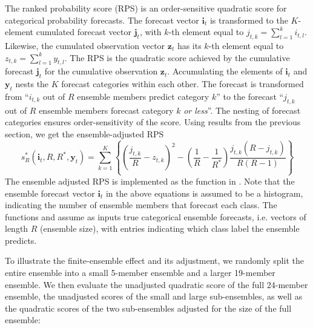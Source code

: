 \documentclass[article]{jss}\usepackage{graphicx, color}
\begin{document}
The ranked probability score (RPS) is an order-sensitive quadratic score for categorical probability forecasts.
The forecast vector $\mathbf{i}_t$ is transformed to the $K$-element cumulated forecast vector $\mathbf{j}_t$, with $k$-th element equal to $j_{t,k} = \sum_{l=1}^k i_{t,l}$.
Likewise, the cumulated observation vector $\mathbf{z}_t$ has its $k$-th element equal to $z_{t,k} = \sum_{l=1}^k y_{t,l}$.
The RPS is the quadratic score achieved by the cumulative forecast $\mathbf{j}_t$ for the cumulative observation $\mathbf{z}_t$.
Accumulating the elements of $\mathbf{i}_t$ and $\mathbf{y}_t$ nests the $K$ forecast categories within each other. 
The forecast is transformed from ``$i_{t,k}$ out of $R$ ensemble members predict category $k$'' to the forecast ``$j_{t,k}$ out of $R$ ensemble members forecast category $k$ \emph{or less}''.
The nesting of forecast categories ensures order-sensitivity of the score.
Using results from the previous section, we get the ensemble-adjusted RPS
%
\begin{equation}
s_{R}^*(\mathbf{i}_t, R, R^*, \mathbf{y}_t) = \sum_{k=1}^K \left\{ \left(\frac{j_{t,k}}{R} - z_{t,k}\right)^2 - \left(\frac{1}{R} - \frac{1}{R^*}\right) \frac{j_{t,k}(R-j_{t,k})}{R(R-1)}\right\}
\end{equation}
%
The ensemble adjusted RPS is implemented as the function  in .
Note that the ensemble forecast vector $\mathbf{i}_t$ in the above equations is assumed to be a histogram, indicating the number of ensemble members that forecast each class. 
The functions  and  assume as inputs true categorical ensemble forecasts, i.e. vectors of length $R$ (ensemble size), with entries indicating which class label the ensemble predicts.



To illustrate the finite-ensemble effect and its adjustment, we randomly split the entire ensemble into a small 5-member ensemble and a larger 19-member ensemble. We then evaluate the unadjusted quadratic score of the full 24-member ensemble, the unadjusted scores of the small and large sub-ensembles, as well as the quadratic scores of the two sub-ensembles adjusted for the size of the full ensemble:
\end{document}
